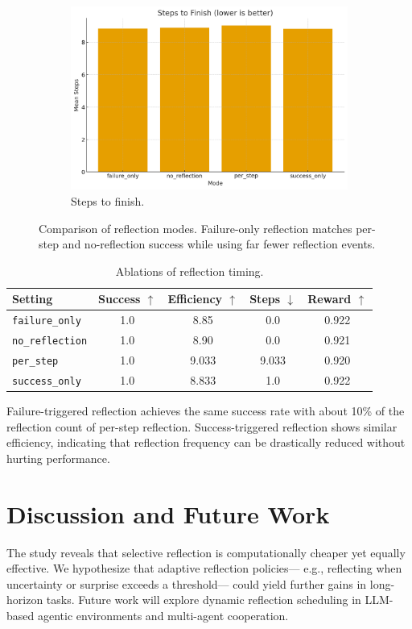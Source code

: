 \documentclass[conference]{IEEEtran}
\begin{document}
\begin{figure}[!t]
\begin{subfigure}{0.48\linewidth}
\includegraphics[width=\linewidth]{plots/reflection_timing_steps.png}
\caption{Steps to finish.}
\end{subfigure}
\caption{Comparison of reflection modes.
Failure-only reflection matches per-step and no-reflection success
while using far fewer reflection events.}
\label{fig:plots}
\end{figure}

\begin{table}[t]
\centering
\caption{Ablations of reflection timing.}
\label{tab:ablation}
\begin{tabular}{lcccc}
\toprule
Setting & Success $\uparrow$ & Efficiency $\uparrow$ & Steps $\downarrow$ & Reward $\uparrow$ \\
\midrule
\texttt{failure\_only}  & 1.0 & 8.85  & 0.0   & 0.922 \\
\texttt{no\_reflection} & 1.0 & 8.90  & 0.0   & 0.921 \\
\texttt{per\_step}      & 1.0 & 9.033 & 9.033 & 0.920 \\
\texttt{success\_only}  & 1.0 & 8.833 & 1.0   & 0.922 \\
\bottomrule
\end{tabular}
\end{table}


Failure-triggered reflection achieves the same success rate
with about 10\% of the reflection count of per-step reflection.
Success-triggered reflection shows similar efficiency,
indicating that reflection frequency can be drastically reduced
without hurting performance.

\section{Discussion and Future Work}
The study reveals that selective reflection
is computationally cheaper yet equally effective.
We hypothesize that adaptive reflection policies---
e.g., reflecting when uncertainty or surprise exceeds a threshold---
could yield further gains in long-horizon tasks.
Future work will explore dynamic reflection scheduling
in LLM-based agentic environments and multi-agent cooperation.
\end{document}
